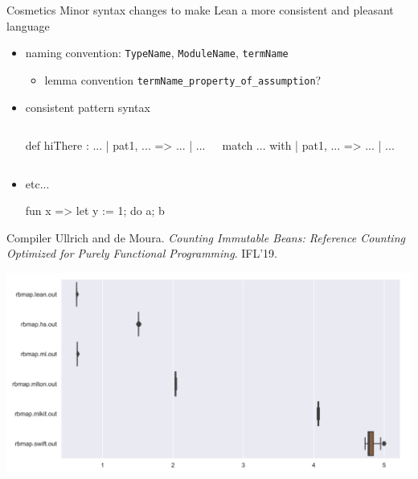 \documentclass[t]{beamer}
\begin{document}
\begin{frame}[fragile]{Cosmetics}
  Minor syntax changes to make Lean a more consistent and pleasant language
  \bigskip

  \begin{itemize}
  \item<+-> naming convention: \texttt{TypeName},  \texttt{ModuleName}, \texttt{termName}
    \begin{itemize}
    \item<+-> lemma convention \verb!termName_property_of_assumption!?
    \end{itemize}
  \item<+-> consistent pattern syntax
    \vspace{-4mm}
    \begin{columns}
      \begin{leancode}
def hiThere : ...
| pat1, ... => ...
| ...
\end{leancode}
\begin{leancode}
match ... with
| pat1, ... => ...
| ...
\end{leancode}
    \end{columns}
  \item<+-> etc...
\begin{leancode}
fun x =>
  let y := 1;
  do a; b
\end{leancode}
  \end{itemize}
\end{frame}

\begin{frame}{Compiler}
  Ullrich and de Moura. \emph{Counting Immutable Beans: Reference Counting Optimized for Purely Functional Programming}. IFL'19.
  
  \includegraphics[width=\textwidth]{bench}
\end{frame}
\end{document}
